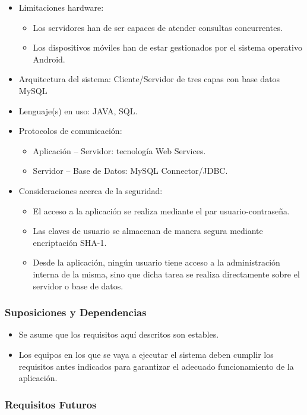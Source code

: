 \begin{itemize}	
	\item Limitaciones hardware:
	\begin{itemize}
		\item Los servidores han de ser capaces de atender consultas concurrentes.
		\item Los dispositivos móviles han de estar gestionados por el sistema operativo Android.
	\end{itemize}
	\item Arquitectura del sistema: Cliente/Servidor de tres capas con base datos MySQL
	\item Lenguaje(s) en uso: JAVA, SQL.
	\item Protocolos de comunicación: 
	\begin{itemize}
		\item Aplicación -- Servidor: tecnología Web Services.
		\item Servidor -- Base de Datos: MySQL Connector/JDBC.
	\end{itemize}
	\item Consideraciones acerca de la seguridad:
	\begin{itemize}
		\item El acceso a la aplicación se realiza mediante el par usuario-contraseña.
		\item Las claves de usuario se almacenan de manera segura mediante encriptación SHA-1.
		\item Desde la aplicación, ningún usuario tiene acceso a la administración interna de la misma, sino que dicha tarea se realiza directamente sobre el servidor o base de datos.
	\end{itemize}
\end{itemize}

\subsubsection{Suposiciones y Dependencias}

\begin{itemize}	
	\item Se asume que los requisitos aquí descritos son estables.
	\item Los equipos en los que se vaya a ejecutar el sistema deben cumplir los requisitos antes indicados para garantizar el adecuado funcionamiento de la aplicación.
\end{itemize}

\subsubsection{Requisitos Futuros}

